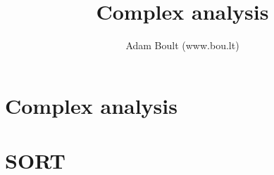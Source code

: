 \documentclass[oneside]{book}
\begin{document}
\author{Adam Boult (www.bou.lt)}
\title{Complex analysis}
\maketitle

\setcounter{tocdepth}{0}
\tableofcontents



\part{Complex analysis}





\part{SORT}

\end{document}
